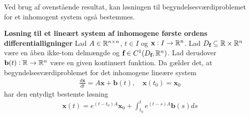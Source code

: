 Ved brug af ovenstående resultat, kan løsningen til begyndelsesværdiproblemet for et inhomogent system også bestemmes. 

\begin{minipage}\textwidth
\begin{thmx} \textbf{Løsning til et lineært system af inhomogene første ordens differentialligninger} \label{sæt:løsning_til_inhomogen_system}%
\newline
Lad $A \in \mathbb{R}^{n \times n}$, $t\in I$ og $\textbf{x}: I \to \mathbb{R}^n$. Lad $D_\textbf{f} \subseteq \mathbb{R}\times \mathbb{R}^n$ være en åben ikke-tom delmængde og $\textbf{f} \in C^1(D_\textbf{f}, \mathbb{R}^n)$. Lad derudover $\mathbf{b}(t): \mathbb{R} \rightarrow \mathbb{R}^n$ være en given kontinuert funktion. Da gælder det, at begyndelsesværdiproblemet for det inhomogene lineære system 
\begin{align}\label{eq:inhomogen_lineart_system}
    \frac{d\textbf{x}}{dt} = A\textbf{x}+\textbf{b}(t), \quad \mathbf{x}(t_0) = \mathbf{x}_0 
\end{align}
har den entydigt bestemte løsning 
\begin{align}\label{eq:løsning_til_inhomogen_lineart_system}
    \textbf{x}(t) = e^{(t-t_0)A}\textbf{x}_0 + \int_{t_0}^t e^{(t-s)A}\textbf{b}(s) ds
\end{align}
\end{thmx}
\end{minipage}

